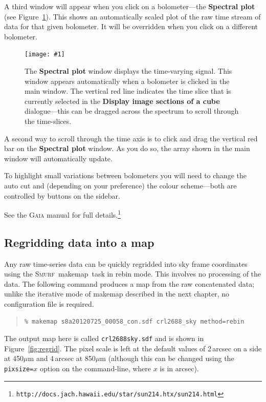 \documentclass[twoside,11pt]{article}
\newcommand{\htmladdimg}[1]{}
\newcommand{\htmlref}[2]{#1}
\newcommand{\latex}[1]{#1}
\newcommand{\latexhtml}[2]{#1}
\newcommand{\xref}[3]{#1}
\newcommand{\xlabel}[1]{}
\renewcommand{\_}{\texttt{\symbol{95}}}
\newenvironment{myquote}{
   \color{MidnightBlue}\begin{quote}\begin{small}}{
   \end{small}\end{quote}
}
\newcommand{\gaia}{\xref{\textsc{Gaia}}{sun214}{}}
\newcommand{\smurf}{\xref{\textsc{Smurf}}{sun258}{}}
\newcommand{\task}[1]{\textsf{#1}}
\newcommand{\file}[1]{\texttt{#1}}
\newcommand{\url}[1]{\texttt{#1}}
\newcommand{\gaiathing}[1]{\textbf{\textsf{#1}}}
\newcommand{\makemap}{\xref{\task{makemap}}{sun258}{MAKEMAP}}
\newcommand{\myfig}[6]{
  \begin{figure}#2
    \centering\texttt{[image: \#1]}
    \typeout{#1 inserted on page \arabic{page}}
    \caption[#5]{\label{#4}\small #6}
  \end{figure}
}
\newcommand{\myfig}[6]{
    \label{#4} \htmladdimg{#1.png}\\
    \\
    Figure: #6\\
  }
\newcommand{\cref}[3]{\latexhtml{#1~\ref{#2}}{\htmlref{#3}{#2}}}
\renewenvironment{myquote}{
      \begin{quote}\begin{small}}{
      \end{small}\end{quote}
   }
\begin{document}
A third window will appear when you click on a bolometer---the
\gaiathing{Spectral plot} (see \cref{Figure}{fig:gaia_spec}{lower graphic}).
This shows an automatically scaled plot of the raw time stream of data for
that given bolometer. It will be overridden when you click on a different
bolometer.

\myfig{sc21_gaia2}{[t]}{width=0.8\linewidth}{fig:gaia_spec}{
  \gaia\ spectral plot window}{
  The \gaiathing{Spectral plot} window displays the time-varying signal. This window
  appears automatically when a bolometer is clicked in the main window.
  The vertical red line indicates the time slice that is currently selected
  in the \gaiathing{Display image sections of a cube} dialogue---this can be
  dragged across the spectrum to scroll through the time-slices.
}

A second way to scroll through the time axis is to click and drag the
vertical red bar on the \gaiathing{Spectral plot} window. As you do
so, the array shown in the main window will automatically update.

To highlight small variations between bolometers you will need to change
the auto cut and (depending on your preference) the
colour scheme---both are controlled by buttons on the sidebar.

See the \xref{\textsc{Gaia} manual}{sun214}{} for full
details.\latex{\footnote{\url{http://docs.jach.hawaii.edu/star/sun214.htx/sun214.html}}}

\clearpage
\subsection{\xlabel{regrid_map}Regridding data into a map}
\label{sec:regrid}

Any raw time-series data can be quickly regridded into sky frame
coordinates using the \smurf\ \makemap\ task in rebin mode. This
involves no processing of the data. The following command produces a
map from the raw concatenated data; unlike the iterative mode of
\task{makemap} described in the next chapter, no configuration file is
required.
\begin{myquote}
\begin{verbatim}
% makemap s8a20120725_00058_con.sdf crl2688_sky method=rebin
\end{verbatim}
\end{myquote}
The output map here is called \file{crl2688\_sky.sdf} and is shown
in \cref{Figure}{fig:regrid}{the figure below}.
The pixel scale is left at the default values of 2\,arcsec on a side at
450$\mu$m and 4\,arcsec at 850$\mu$m (although this can be changed
using the \texttt{pixsize=}$x$ option on the command-line, where $x$ is in
arcsec).
\end{document}
